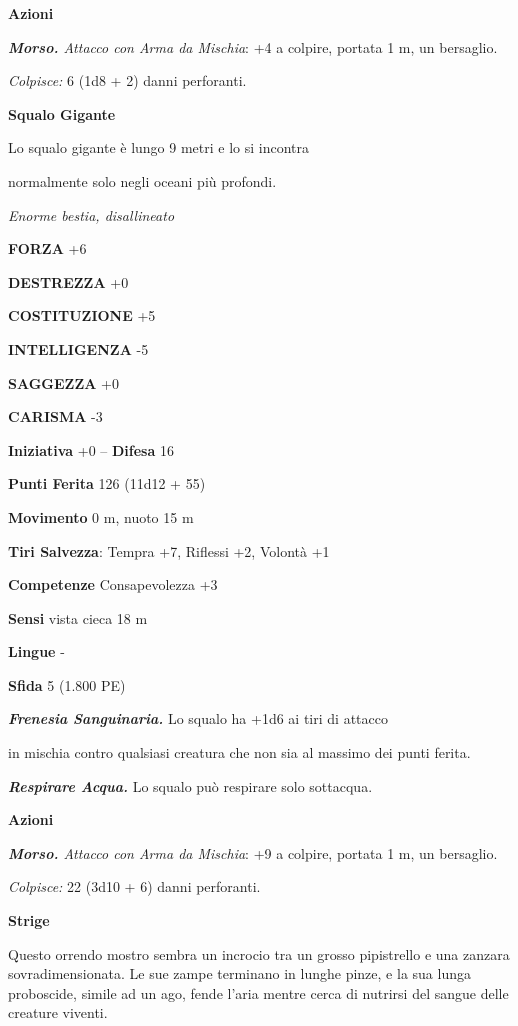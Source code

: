 \begin{multicols}{2}
\textbf{Azioni}

\emph{\textbf{Morso.} Attacco con Arma da Mischia}: +4 a colpire, portata 1 m, un bersaglio.

\emph{Colpisce:} 6 (1d8 + 2) danni perforanti.

\medskip\textbf{Squalo Gigante}

Lo squalo gigante è lungo 9 metri e lo si incontra

normalmente solo negli oceani più profondi.

\emph{Enorme bestia, disallineato}

\textbf{FORZA} +6

\textbf{DESTREZZA} +0

\textbf{COSTITUZIONE} +5

\textbf{INTELLIGENZA} -5

\textbf{SAGGEZZA} +0

\textbf{CARISMA} -3

\textbf{Iniziativa} +0 -- \textbf{Difesa} 16

\textbf{Punti Ferita} 126 (11d12 + 55)

\textbf{Movimento} 0 m, nuoto 15 m

\textbf{Tiri Salvezza}: Tempra +7, Riflessi +2, Volontà +1

\textbf{Competenze} Consapevolezza +3

\textbf{Sensi} vista cieca 18 m

\textbf{Lingue} -

\textbf{Sfida} 5 (1.800 PE)

\emph{\textbf{Frenesia Sanguinaria.}} Lo squalo ha +1d6 ai tiri di attacco

in mischia contro qualsiasi creatura che non sia al massimo dei punti ferita.

\emph{\textbf{Respirare Acqua.}} Lo squalo può respirare solo sottacqua. 

\textbf{Azioni}

\emph{\textbf{Morso.} Attacco con Arma da Mischia}: +9 a colpire, portata 1 m, un bersaglio.

\emph{Colpisce:} 22 (3d10 + 6) danni perforanti.

\medskip\textbf{Strige}

Questo orrendo mostro sembra un incrocio tra un grosso pipistrello e una zanzara sovradimensionata. Le sue zampe terminano in lunghe pinze, e la sua lunga proboscide, simile ad un ago, fende l'aria mentre cerca di nutrirsi del sangue delle creature viventi. 


\end{multicols}
